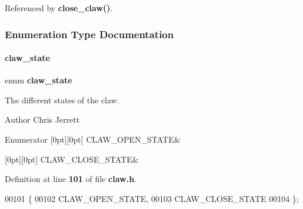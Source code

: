 Referenced by \textbf{ close\+\_\+claw()}.



\subsubsection{Enumeration Type Documentation}
\mbox{\label{claw_8h_a600668fd307d596c3812126657335324}} 
\paragraph{claw\+\_\+state}
{\footnotesize\ttfamily enum \textbf{ claw\+\_\+state}}



The different states of the claw. 

\begin{DoxyAuthor}{Author}
Chris Jerrett 
\end{DoxyAuthor}
\begin{DoxyEnumFields}{Enumerator}
[0pt][0pt]{}\mbox{\label{claw_8h_a600668fd307d596c3812126657335324ab871ce9ec2796d275c09bf01abcac2cd}} 
C\+L\+A\+W\+\_\+\+O\+P\+E\+N\+\_\+\+S\+T\+A\+TE&\\
\hline

[0pt][0pt]{}\mbox{\label{claw_8h_a600668fd307d596c3812126657335324a3948a2d760f710e9087edded3df98b5f}} 
C\+L\+A\+W\+\_\+\+C\+L\+O\+S\+E\+\_\+\+S\+T\+A\+TE&\\
\hline

\end{DoxyEnumFields}


Definition at line \textbf{ 101} of file \textbf{ claw.\+h}.


\begin{DoxyCode}
00101                 \{
00102   CLAW_OPEN_STATE,
00103   CLAW_CLOSE_STATE
00104 \};
\end{DoxyCode}


